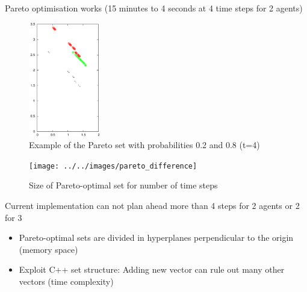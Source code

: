 \documentclass{beamer}
\begin{document}
\begin{frame}[Results]
	Pareto optimisation works (15 minutes to 4 seconds at 4 time steps for 2
	agents)
	\begin{figure}
		\centering
		\includegraphics[height=5cm]{../../images/t4_28}
		\caption{Example of the Pareto set with probabilities 0.2 and 0.8 (t=4)}
		\label{fig:t4_28}
	\end{figure}
\end{frame}


\begin{frame}[Results]
	\begin{figure}
		\texttt{[image: ../../images/pareto\_difference]}
		\label{fig:../../images/pareto_difference}
		\caption{Size of Pareto-optimal set for number of time steps}
	\end{figure}
	Current implementation can not plan ahead more than 4 steps for 2 agents or
	2 for 3
\end{frame}

\begin{frame}
	\begin{itemize}
		\item Pareto-optimal sets are divided in hyperplanes perpendicular to the
			origin (memory space)
		\item Exploit C++ set structure: Adding new vector can rule out many
			other vectors (time complexity)
	\end{itemize}
\end{frame}
\end{document}
